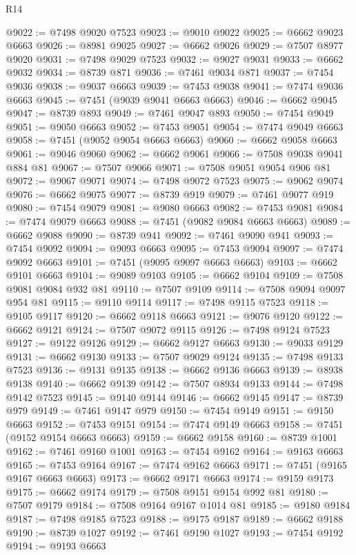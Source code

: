 \begin{lexlean}{R14}
\begin{coremodule}
{{{{{{{{{{{{{{{{{{{{{{{{{{{{{{{{{{{{{{{{{{{{{{{{{{{{{{{{{{{{{{{{{{{{{{{{{{{{{{{{{{@9022 := @7498 @9020 @7523
@9023 := @9010 @9022
@9025 := @6662 @9023 @6663
@9026 := @8981 @9025
@9027 := @6662 @9026
@9029 := @7507 @8977 @9020
@9031 := @7498 @9029 @7523
@9032 := @9027 @9031
@9033 := @6662 @9032
@9034 := @8739 @871
@9036 := @7461 @9034 @871
@9037 := @7454 @9036
@9038 := @9037 @6663
@9039 := @7453 @9038
@9041 := @7474 @9036 @6663
@9045 := @7451 (@9039 @9041 @6663 @6663)
@9046 := @6662 @9045
@9047 := @8739 @893
@9049 := @7461 @9047 @893
@9050 := @7454 @9049
@9051 := @9050 @6663
@9052 := @7453 @9051
@9054 := @7474 @9049 @6663
@9058 := @7451 (@9052 @9054 @6663 @6663)
@9060 := @6662 @9058 @6663
@9061 := @9046 @9060
@9062 := @6662 @9061
@9066 := @7508 @9038 @9041 @884 @81
@9067 := @7507 @9066
@9071 := @7508 @9051 @9054 @906 @81
@9072 := @9067 @9071
@9074 := @7498 @9072 @7523
@9075 := @9062 @9074
@9076 := @6662 @9075
@9077 := @8739 @919
@9079 := @7461 @9077 @919
@9080 := @7454 @9079
@9081 := @9080 @6663
@9082 := @7453 @9081
@9084 := @7474 @9079 @6663
@9088 := @7451 (@9082 @9084 @6663 @6663)
@9089 := @6662 @9088
@9090 := @8739 @941
@9092 := @7461 @9090 @941
@9093 := @7454 @9092
@9094 := @9093 @6663
@9095 := @7453 @9094
@9097 := @7474 @9092 @6663
@9101 := @7451 (@9095 @9097 @6663 @6663)
@9103 := @6662 @9101 @6663
@9104 := @9089 @9103
@9105 := @6662 @9104
@9109 := @7508 @9081 @9084 @932 @81
@9110 := @7507 @9109
@9114 := @7508 @9094 @9097 @954 @81
@9115 := @9110 @9114
@9117 := @7498 @9115 @7523
@9118 := @9105 @9117
@9120 := @6662 @9118 @6663
@9121 := @9076 @9120
@9122 := @6662 @9121
@9124 := @7507 @9072 @9115
@9126 := @7498 @9124 @7523
@9127 := @9122 @9126
@9129 := @6662 @9127 @6663
@9130 := @9033 @9129
@9131 := @6662 @9130
@9133 := @7507 @9029 @9124
@9135 := @7498 @9133 @7523
@9136 := @9131 @9135
@9138 := @6662 @9136 @6663
@9139 := @8938 @9138
@9140 := @6662 @9139
@9142 := @7507 @8934 @9133
@9144 := @7498 @9142 @7523
@9145 := @9140 @9144
@9146 := @6662 @9145
@9147 := @8739 @979
@9149 := @7461 @9147 @979
@9150 := @7454 @9149
@9151 := @9150 @6663
@9152 := @7453 @9151
@9154 := @7474 @9149 @6663
@9158 := @7451 (@9152 @9154 @6663 @6663)
@9159 := @6662 @9158
@9160 := @8739 @1001
@9162 := @7461 @9160 @1001
@9163 := @7454 @9162
@9164 := @9163 @6663
@9165 := @7453 @9164
@9167 := @7474 @9162 @6663
@9171 := @7451 (@9165 @9167 @6663 @6663)
@9173 := @6662 @9171 @6663
@9174 := @9159 @9173
@9175 := @6662 @9174
@9179 := @7508 @9151 @9154 @992 @81
@9180 := @7507 @9179
@9184 := @7508 @9164 @9167 @1014 @81
@9185 := @9180 @9184
@9187 := @7498 @9185 @7523
@9188 := @9175 @9187
@9189 := @6662 @9188
@9190 := @8739 @1027
@9192 := @7461 @9190 @1027
@9193 := @7454 @9192
@9194 := @9193 @6663
}}}}}}}}}}}}}}}}}}}}}}}}}}}}}}}}}}}}}}}}}}}}}}}}}}}}}}}}}}}}}}}}}}}}}}}}}}}}}}}}}}
\end{coremodule}
\end{lexlean}

